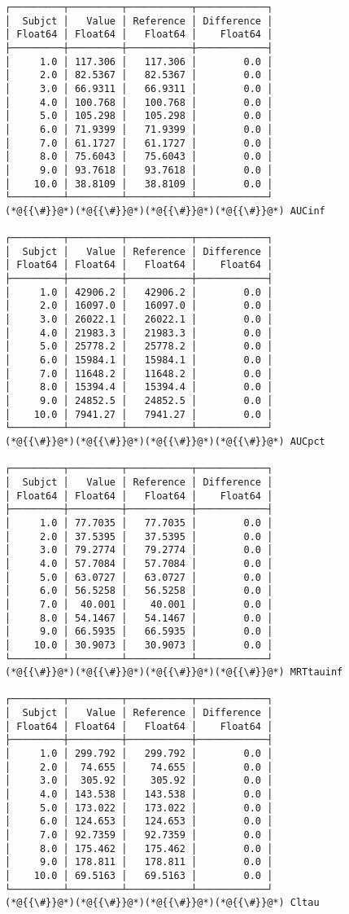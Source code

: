 \documentclass[12pt,a4paper]{article}
\begin{document}
\begin{lstlisting}
┌─────────┬─────────┬───────────┬────────────┐
│  Subjct │   Value │ Reference │ Difference │
│ Float64 │ Float64 │   Float64 │    Float64 │
├─────────┼─────────┼───────────┼────────────┤
│     1.0 │ 117.306 │   117.306 │        0.0 │
│     2.0 │ 82.5367 │   82.5367 │        0.0 │
│     3.0 │ 66.9311 │   66.9311 │        0.0 │
│     4.0 │ 100.768 │   100.768 │        0.0 │
│     5.0 │ 105.298 │   105.298 │        0.0 │
│     6.0 │ 71.9399 │   71.9399 │        0.0 │
│     7.0 │ 61.1727 │   61.1727 │        0.0 │
│     8.0 │ 75.6043 │   75.6043 │        0.0 │
│     9.0 │ 93.7618 │   93.7618 │        0.0 │
│    10.0 │ 38.8109 │   38.8109 │        0.0 │
└─────────┴─────────┴───────────┴────────────┘
(*@{{\#}}@*)(*@{{\#}}@*)(*@{{\#}}@*)(*@{{\#}}@*) AUCinf

┌─────────┬─────────┬───────────┬────────────┐
│  Subjct │   Value │ Reference │ Difference │
│ Float64 │ Float64 │   Float64 │    Float64 │
├─────────┼─────────┼───────────┼────────────┤
│     1.0 │ 42906.2 │   42906.2 │        0.0 │
│     2.0 │ 16097.0 │   16097.0 │        0.0 │
│     3.0 │ 26022.1 │   26022.1 │        0.0 │
│     4.0 │ 21983.3 │   21983.3 │        0.0 │
│     5.0 │ 25778.2 │   25778.2 │        0.0 │
│     6.0 │ 15984.1 │   15984.1 │        0.0 │
│     7.0 │ 11648.2 │   11648.2 │        0.0 │
│     8.0 │ 15394.4 │   15394.4 │        0.0 │
│     9.0 │ 24852.5 │   24852.5 │        0.0 │
│    10.0 │ 7941.27 │   7941.27 │        0.0 │
└─────────┴─────────┴───────────┴────────────┘
(*@{{\#}}@*)(*@{{\#}}@*)(*@{{\#}}@*)(*@{{\#}}@*) AUCpct

┌─────────┬─────────┬───────────┬────────────┐
│  Subjct │   Value │ Reference │ Difference │
│ Float64 │ Float64 │   Float64 │    Float64 │
├─────────┼─────────┼───────────┼────────────┤
│     1.0 │ 77.7035 │   77.7035 │        0.0 │
│     2.0 │ 37.5395 │   37.5395 │        0.0 │
│     3.0 │ 79.2774 │   79.2774 │        0.0 │
│     4.0 │ 57.7084 │   57.7084 │        0.0 │
│     5.0 │ 63.0727 │   63.0727 │        0.0 │
│     6.0 │ 56.5258 │   56.5258 │        0.0 │
│     7.0 │  40.001 │    40.001 │        0.0 │
│     8.0 │ 54.1467 │   54.1467 │        0.0 │
│     9.0 │ 66.5935 │   66.5935 │        0.0 │
│    10.0 │ 30.9073 │   30.9073 │        0.0 │
└─────────┴─────────┴───────────┴────────────┘
(*@{{\#}}@*)(*@{{\#}}@*)(*@{{\#}}@*)(*@{{\#}}@*) MRTtauinf

┌─────────┬─────────┬───────────┬────────────┐
│  Subjct │   Value │ Reference │ Difference │
│ Float64 │ Float64 │   Float64 │    Float64 │
├─────────┼─────────┼───────────┼────────────┤
│     1.0 │ 299.792 │   299.792 │        0.0 │
│     2.0 │  74.655 │    74.655 │        0.0 │
│     3.0 │  305.92 │    305.92 │        0.0 │
│     4.0 │ 143.538 │   143.538 │        0.0 │
│     5.0 │ 173.022 │   173.022 │        0.0 │
│     6.0 │ 124.653 │   124.653 │        0.0 │
│     7.0 │ 92.7359 │   92.7359 │        0.0 │
│     8.0 │ 175.462 │   175.462 │        0.0 │
│     9.0 │ 178.811 │   178.811 │        0.0 │
│    10.0 │ 69.5163 │   69.5163 │        0.0 │
└─────────┴─────────┴───────────┴────────────┘
(*@{{\#}}@*)(*@{{\#}}@*)(*@{{\#}}@*)(*@{{\#}}@*) Cltau


\end{lstlisting}
\end{document}
